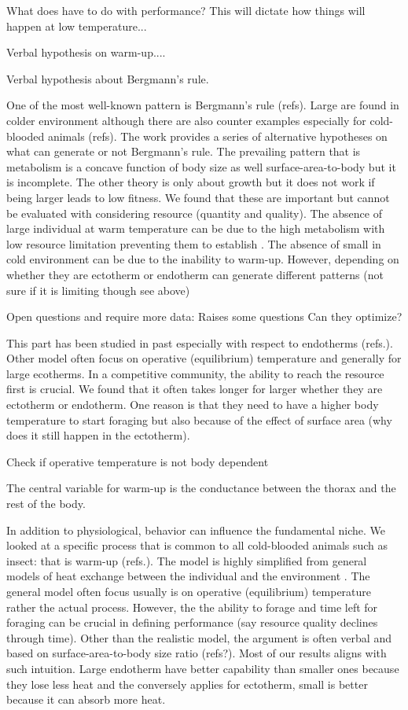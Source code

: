 What does have to do with performance?
This will dictate how things will happen at low temperature...

Verbal hypothesis on warm-up....


Verbal hypothesis about Bergmann's rule.

One of the most well-known pattern is Bergmann's rule (refs).
Large are found in colder environment although there are also counter examples especially for cold-blooded animals (refs).
The work provides a series of alternative hypotheses on what can generate or not Bergmann's rule.
The prevailing pattern that is metabolism is a concave function of body size as well surface-area-to-body but it is incomplete.
The other theory is only about growth but it does not work if being larger leads to low fitness.
We found that these are important but cannot be evaluated with considering resource (quantity and quality).
The absence of large individual at warm temperature can be due to the high metabolism with low resource limitation preventing them to establish \citep{Angert2005}. 
The absence of small in cold environment can be due to the inability to warm-up.
However, depending on whether they are ectotherm or endotherm can generate different patterns (not sure if it is limiting though see above)


Open questions and require more data:
Raises some questions
Can they optimize?

This part has been studied in past especially with respect to endotherms (refs.).
Other model often focus on operative (equilibrium) temperature and generally for large ecotherms.
In a competitive community, the ability to reach the resource first is crucial.
We found that it often takes longer for larger whether they are ectotherm or endotherm.
One reason is that they need to have a higher body temperature to start foraging but also because of the effect of surface area (why does it still happen in the ectotherm).

Check if operative temperature is not body dependent



The central variable for warm-up is the conductance between the thorax and the rest of the body. 



In addition to physiological, behavior can influence the fundamental niche.
We looked at a specific process that is common to all cold-blooded animals such as insect: that is warm-up (refs.).
The model is highly simplified from general models of heat exchange between the individual and the environment \citep[e.g.,][]{Campbell2012}.
The general model often focus usually is on operative (equilibrium) temperature \citep[e.g.]{Angilletta2009} rather the actual process.
However, the the ability to forage and time left for foraging can be crucial in defining performance (say resource quality declines through time).
Other than the realistic model, the argument is often verbal and based on surface-area-to-body size ratio (refs?).
Most of our results aligns with  such intuition. 
Large endotherm have better capability than smaller ones because they lose less heat and the conversely applies for ectotherm, small is better because it can absorb more heat.


